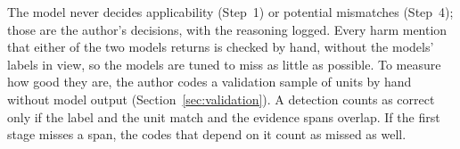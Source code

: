 The model never decides applicability (Step~1) or potential mismatches
(Step~4); those are the author's decisions, with the reasoning logged. Every
harm mention that either of the two models returns is checked by hand, without the
models' labels in view, so the models are tuned to miss as little as possible. To
measure how good they are, the author codes a validation sample of
units by hand without model output (Section~\ref{sec:validation}). A detection counts
as correct only if the label and the unit match and the evidence spans overlap. If the
first stage misses a span, the codes that depend on it count as missed as well.
